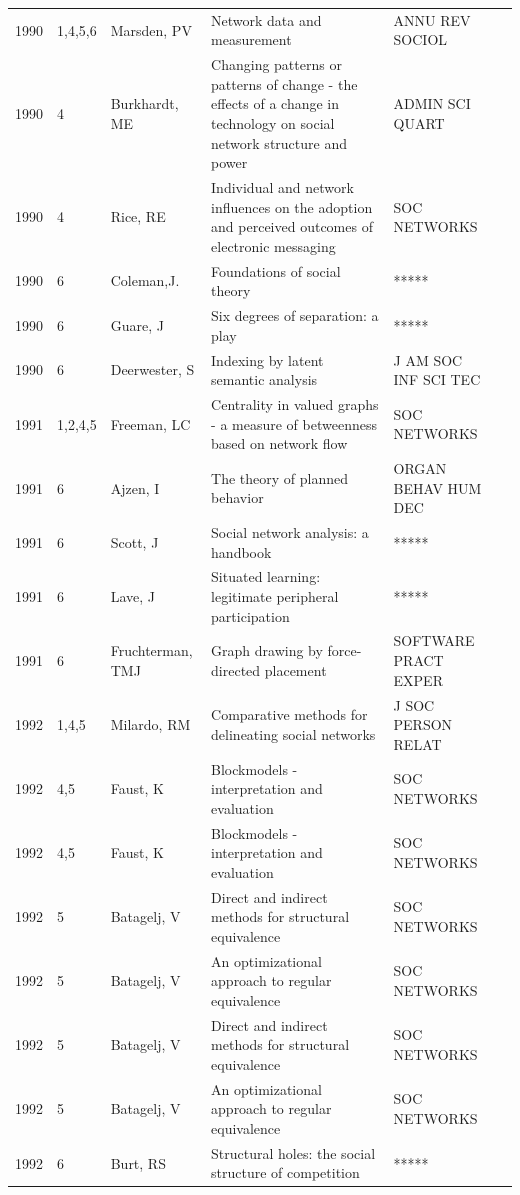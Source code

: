 \documentclass[11pt]{article} %
\begin{document}
\begin{longtable}{p{0.8cm}|p{1.25cm}|p{2.8cm}|p{7.5cm}|p{3cm}l}
1990&	1,4,5,6&	Marsden, PV&	 Network data and measurement&         	ANNU REV SOCIOL\\
1990&	4&	Burkhardt, ME&	 Changing patterns or patterns of change - the effects of a change in technology on social network structure and power&         	ADMIN SCI QUART\\
1990&	4&	Rice, RE&	 Individual and network influences on the adoption and perceived outcomes of electronic messaging&         	SOC NETWORKS\\
1990&	6&	Coleman,J.&	Foundations of social theory&         	*****\\
1990&	6&	Guare, J&	Six degrees of separation: a play&         	*****\\
1990&	6&	Deerwester, S&	Indexing by latent semantic analysis&         	J AM SOC INF SCI TEC\\
1991&	1,2,4,5&	Freeman, LC&	 Centrality in valued graphs - a measure of betweenness based on network flow&         	SOC NETWORKS\\
1991&	6&	Ajzen, I&	The theory of planned behavior&         	ORGAN BEHAV HUM DEC\\
1991&	6&	Scott, J&	Social network analysis: a handbook &         	*****\\
1991&	6&	Lave, J &	Situated learning: legitimate peripheral participation  &        	*****\\
1991&	6&	Fruchterman, TMJ&	 Graph drawing by force-directed placement&         	SOFTWARE PRACT EXPER\\
1992&	1,4,5&	Milardo, RM&	 Comparative methods for delineating social networks&         	J SOC PERSON RELAT\\
1992&	4,5&	Faust, K&	 Blockmodels - interpretation and evaluation&         	SOC NETWORKS\\
1992&	4,5&	Faust, K&	 Blockmodels - interpretation and evaluation&         	SOC NETWORKS\\
1992&	5&	Batagelj, V&	 Direct and indirect methods for structural equivalence&         	SOC NETWORKS\\
1992&	5&	Batagelj, V&	 An optimizational approach to regular equivalence&         	SOC NETWORKS\\
1992&	5&	Batagelj, V&	 Direct and indirect methods for structural equivalence&         	SOC NETWORKS\\
1992&	5&	Batagelj, V&	 An optimizational approach to regular equivalence&         	SOC NETWORKS\\
1992&	6&	Burt, RS &	 Structural holes: the social structure of competition&         	*****\\

\end{longtable}
\end{document}
